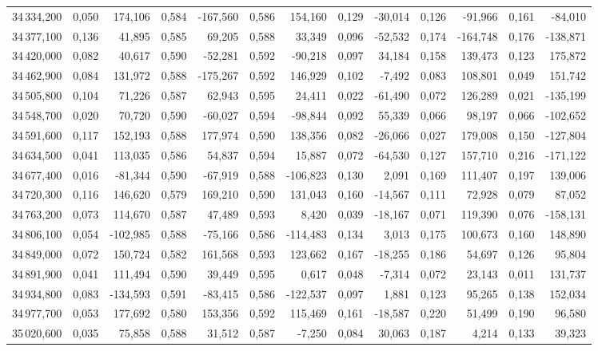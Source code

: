 \begin{longtable}{rrrrrrrrrrrrr}
34\,334,200 & 0,050 & 174,106 & 0,584 & -167,560 & 0,586 & 154,160 & 0,129 & -30,014 & 0,126 & -91,966 & 0,161 & -84,010\\
34\,377,100 & 0,136 & 41,895 & 0,585 & 69,205 & 0,588 & 33,349 & 0,096 & -52,532 & 0,174 & -164,748 & 0,176 & -138,871\\
34\,420,000 & 0,082 & 40,617 & 0,590 & -52,281 & 0,592 & -90,218 & 0,097 & 34,184 & 0,158 & 139,473 & 0,123 & 175,872\\
34\,462,900 & 0,084 & 131,972 & 0,588 & -175,267 & 0,592 & 146,929 & 0,102 & -7,492 & 0,083 & 108,801 & 0,049 & 151,742\\
34\,505,800 & 0,104 & 71,226 & 0,587 & 62,943 & 0,595 & 24,411 & 0,022 & -61,490 & 0,072 & 126,289 & 0,021 & -135,199\\
34\,548,700 & 0,020 & 70,720 & 0,590 & -60,027 & 0,594 & -98,844 & 0,092 & 55,339 & 0,066 & 98,197 & 0,066 & -102,652\\
34\,591,600 & 0,117 & 152,193 & 0,588 & 177,974 & 0,590 & 138,356 & 0,082 & -26,066 & 0,027 & 179,008 & 0,150 & -127,804\\
34\,634,500 & 0,041 & 113,035 & 0,586 & 54,837 & 0,594 & 15,887 & 0,072 & -64,530 & 0,127 & 157,710 & 0,216 & -171,122\\
34\,677,400 & 0,016 & -81,344 & 0,590 & -67,919 & 0,588 & -106,823 & 0,130 & 2,091 & 0,169 & 111,407 & 0,197 & 139,006\\
34\,720,300 & 0,116 & 146,620 & 0,579 & 169,210 & 0,590 & 131,043 & 0,160 & -14,567 & 0,111 & 72,928 & 0,079 & 87,052\\
34\,763,200 & 0,073 & 114,670 & 0,587 & 47,489 & 0,593 & 8,420 & 0,039 & -18,167 & 0,071 & 119,390 & 0,076 & -158,131\\
34\,806,100 & 0,054 & -102,985 & 0,588 & -75,166 & 0,586 & -114,483 & 0,134 & 3,013 & 0,175 & 100,673 & 0,160 & 148,890\\
34\,849,000 & 0,072 & 150,724 & 0,582 & 161,568 & 0,593 & 123,662 & 0,167 & -18,255 & 0,186 & 54,697 & 0,126 & 95,804\\
34\,891,900 & 0,041 & 111,494 & 0,590 & 39,449 & 0,595 & 0,617 & 0,048 & -7,314 & 0,072 & 23,143 & 0,011 & 131,737\\
34\,934,800 & 0,083 & -134,593 & 0,591 & -83,415 & 0,586 & -122,537 & 0,097 & 1,881 & 0,123 & 95,265 & 0,138 & 152,034\\
34\,977,700 & 0,053 & 177,692 & 0,580 & 153,356 & 0,592 & 115,469 & 0,161 & -18,587 & 0,220 & 51,499 & 0,190 & 96,580\\
35\,020,600 & 0,035 & 75,858 & 0,588 & 31,512 & 0,587 & -7,250 & 0,084 & 30,063 & 0,187 & 4,214 & 0,133 & 39,323\\

\end{longtable}
